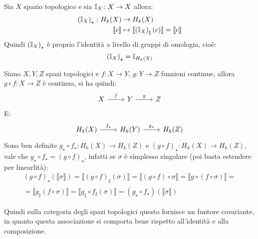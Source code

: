 
\begin{osservation}
  Sia $ X $ spazio topologico e sia $ \mathbb{I}_{X} \colon X \to X $ allora:
  \begin{align*}
    \left(\mathbb{I}_{X}\right)_\star \colon H_k(X) & \to H_k(X) \\
     \llbracket c \rrbracket  & \mapsto \llbracket \left(\mathbb{I}_{X}\right)_\sharp (c) \rrbracket = \llbracket c \rrbracket
  \end{align*}
  Quindi $ \left(\mathbb{I}_{X}\right)_\star $ è proprio l'identità
  a livello di gruppi di omologia, cioè:
  \[
    \left(\mathbb{I}_{X}\right)_\star = \mathbb{I}_{H_k(X)}
  \]
\end{osservation}

\begin{osservation}
  Siano $ X, Y, Z $ spazi topologici e $ f \colon X \to Y $,
  $ g \colon Y \to Z $ funzioni continue, allora $ g \circ f \colon X \to Z $
  è continua, si ha quindi:
  \[
    \begin{tikzcd}
      X \arrow{r}{f} &  Y  \arrow{r}{g} & Z
    \end{tikzcd}
  \]
  E:
  \[
    \begin{tikzcd}
      H_k(X) \arrow{r}{f_\star} &  H_k(Y) \arrow{r}{g_\star} & H_k(Z)
    \end{tikzcd}
  \]
  Sono ben definite $ g_\star \circ f_\star \colon H_k(X) \to H_k(Z) $ e
  $ \left(g \circ f\right)_\star \colon H_k(X) \to H_k(Z) $, vale che
  $ g_\star \circ f_\star =  \left(g \circ f\right)_\star $, infatti se $ \sigma $ è
  simplesso singolare (poi basta estendere per linearlità):
  \begin{gather*}
    \left(g \circ f\right)_\star ( \llbracket \sigma \rrbracket) = \llbracket (g \circ f)_\sharp (\sigma) \rrbracket = \llbracket (g \circ f) \circ \sigma \rrbracket =  \llbracket g \circ (f \circ \sigma) \rrbracket = \\
    = \llbracket g_\sharp (f \circ \sigma) \rrbracket = \llbracket g_\sharp \circ f_\sharp (\sigma) \rrbracket = (g_\star \circ f_\star) (\llbracket\sigma\rrbracket)
  \end{gather*}
\end{osservation}
Quindi sulla categoria degli spazi topologici questo
fornisce un funtore covariante, in quanto questa associazione
si comporta bene rispetto all'identità e alla composizione.

